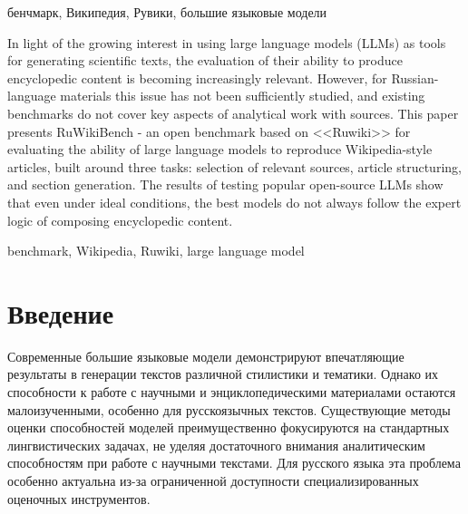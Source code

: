 \documentclass{article}
\begin{document}
\begin{keywords}
бенчмарк, Википедия, Рувики, большие языковые модели
\end{keywords}

\begin{altabstract}
In light of the growing interest in using large language models (LLMs) as tools for generating scientific texts,
the evaluation of their ability to produce encyclopedic content is becoming increasingly relevant.
However, for Russian-language materials this issue has not been sufficiently studied, and existing benchmarks do not cover key aspects of analytical work with sources.
This paper presents RuWikiBench - an open benchmark based on <<Ruwiki>> for evaluating the ability of large language models to reproduce Wikipedia-style articles,
built around three tasks:
selection of relevant sources, article structuring, and section generation.
The results of testing popular open-source LLMs show that even under ideal conditions, the best models do not always follow the expert logic of composing encyclopedic content.
\end{altabstract}

\begin{altkeywords}
benchmark, Wikipedia, Ruwiki, large language model
\end{altkeywords}

\section*{Введение}

Современные большие языковые модели демонстрируют впечатляющие результаты в генерации текстов различной стилистики и тематики. 
Однако их способности к работе с научными и энциклопедическими материалами остаются малоизученными, особенно для русскоязычных текстов.
Существующие методы оценки способностей моделей преимущественно фокусируются на стандартных лингвистических задачах, не уделяя достаточного внимания аналитическим способностям при работе с научными текстами.
Для русского языка эта проблема особенно актуальна из-за ограниченной доступности специализированных оценочных инструментов.
\end{document}
